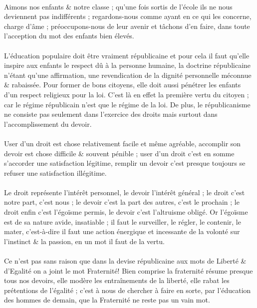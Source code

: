 \documentclass[../eBook.tex]{subfiles}
\begin{document}
    \paragraph{}Aimons nos enfants \& notre classe ; qu'une fois sortis de l'école ils ne nous deviennent pas indifférents ; regardons-nous comme ayant en ce qui les concerne, charge d'âme ; préoccupons-nous de leur avenir et tâchons d'en faire, dans toute l'acception du mot des enfants bien élevés.
    \paragraph{}L'éducation populaire doit être vraiment républicaine et pour cela il faut qu'elle inspire aux enfants le respect dû à la personne humaine, la doctrine républicaine n'étant qu'une affirmation, une revendication de la dignité personnelle méconnue \& rabaissée. Pour former de bons citoyens, elle doit aussi pénétrer les enfants d'un respect religieux pour la loi. C'est là en effet la première vertu du citoyen ; car le régime républicain n'est que le régime de la loi. De plus, le républicanisme ne consiste pas seulement dans l'exercice des droits mais surtout dans l'accomplissement du devoir.
    \paragraph{}User d'un droit est chose relativement facile et même agréable, accomplir son devoir est chose difficile \& souvent pénible ; user d'un droit c'est en somme s'accorder une satisfaction légitime, remplir un devoir c'est presque toujours se refuser une satisfaction illégitime.
    \paragraph{}Le droit représente l'intérêt personnel, le devoir l'intérêt général ; le droit c'est notre part, c'est nous ; le devoir c'est la part des autres, c'est le prochain ; le droit enfin c'est l'égoïsme permis, le devoir c'est l'altruisme obligé. Or l'égoïsme est de sa nature avide, insatiable ; il faut le surveiller, le régler, le contenir, le mater, c'est-à-dire il faut une action énergique et incessante de la volonté sur l'instinct \& la passion, en un mot il faut de la vertu.
    \paragraph{}Ce n'est pas sans raison que dans la devise républicaine aux mots de Liberté \& d'Egalité on a joint le mot Fraternité! Bien comprise la fraternité résume presque tous nos devoirs, elle modère les entraînements de la liberté, elle rabat les prétentions de l'égalité ; c'est à nous de chercher à faire en sorte, par l'éducation des hommes de demain, que la Fraternité ne reste pas un vain mot.
\end{document}
